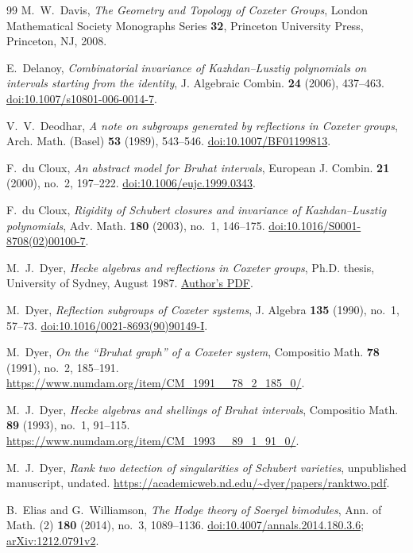 \begin{thebibliography}{99}
M.~W.~Davis,
\emph{The Geometry and Topology of Coxeter Groups},
London Mathematical Society Monographs Series \textbf{32},
Princeton University Press, Princeton, NJ, 2008.

E.~Delanoy,
\emph{Combinatorial invariance of Kazhdan--Lusztig polynomials on intervals starting from the identity},
J. Algebraic Combin. \textbf{24} (2006), 437--463.
\href{https://doi.org/10.1007/s10801-006-0014-7}{doi:10.1007/s10801-006-0014-7}.

V.~V.~Deodhar,
\emph{A note on subgroups generated by reflections in Coxeter groups},
Arch. Math. (Basel) \textbf{53} (1989), 543--546.
\href{https://doi.org/10.1007/BF01199813}{doi:10.1007/BF01199813}.

F.~du Cloux,
\emph{An abstract model for Bruhat intervals},
European J. Combin. \textbf{21} (2000), no.~2, 197--222.
\href{https://doi.org/10.1006/eujc.1999.0343}{doi:10.1006/eujc.1999.0343}.

F.~du Cloux,
\emph{Rigidity of Schubert closures and invariance of Kazhdan--Lusztig polynomials},
Adv. Math. \textbf{180} (2003), no.~1, 146--175.
\href{https://doi.org/10.1016/S0001-8708(02)00100-7}{doi:10.1016/S0001-8708(02)00100-7}.

M.~J.~Dyer,
\emph{Hecke algebras and reflections in Coxeter groups},
Ph.D. thesis, University of Sydney, August 1987.
\href{https://academicweb.nd.edu/~dyer/papers/dyerthesis.pdf}{Author's PDF}.

M.~Dyer,
\emph{Reflection subgroups of Coxeter systems},
J. Algebra \textbf{135} (1990), no.~1, 57--73.
\href{https://doi.org/10.1016/0021-8693(90)90149-I}{doi:10.1016/0021-8693(90)90149-I}.

M.~Dyer,
\emph{On the ``Bruhat graph'' of a Coxeter system},
Compositio Math. \textbf{78} (1991), no.~2, 185--191.
\url{https://www.numdam.org/item/CM_1991__78_2_185_0/}.

M.~J.~Dyer,
\emph{Hecke algebras and shellings of Bruhat intervals},
Compositio Math. \textbf{89} (1993), no.~1, 91--115.
\url{https://www.numdam.org/item/CM_1993__89_1_91_0/}.

M.~J.~Dyer,
\emph{Rank two detection of singularities of Schubert varieties},
unpublished manuscript, undated.
\url{https://academicweb.nd.edu/~dyer/papers/ranktwo.pdf}.

B.~Elias and G.~Williamson,
\emph{The Hodge theory of Soergel bimodules},
Ann. of Math. (2) \textbf{180} (2014), no.~3, 1089--1136.
\href{https://doi.org/10.4007/annals.2014.180.3.6}{doi:10.4007/annals.2014.180.3.6};
\href{https://arxiv.org/abs/1212.0791v2}{arXiv:1212.0791v2}.


\end{thebibliography}
